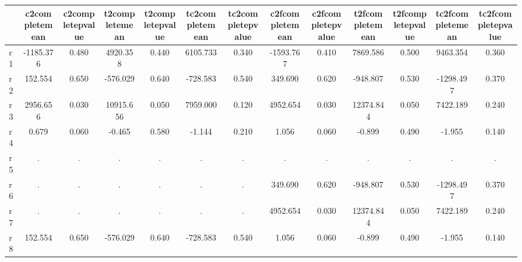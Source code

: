 \begin{table}[htbp]
\begin{tabular}{lcccccccccccc} \hline \hline
 & c2completemean  & c2completepvalue  & t2completemean  & t2completepvalue  & tc2completemean  & tc2completepvalue  & c2fcompletemean  & c2fcompletepvalue  & t2fcompletemean  & t2fcompletepvalue  & tc2fcompletemean  & tc2fcompletepvalue  \\  \hline 
r1 & -1185.376 &     0.480 &  4920.358 &     0.440 &  6105.733 &     0.340 & -1593.767 &     0.410 &  7869.586 &     0.500 &  9463.354 &     0.360 \\  
r2 &   152.554 &     0.650 &  -576.029 &     0.640 &  -728.583 &     0.540 &   349.690 &     0.620 &  -948.807 &     0.530 & -1298.497 &     0.370 \\  
r3 &  2956.656 &     0.030 & 10915.656 &     0.050 &  7959.000 &     0.120 &  4952.654 &     0.030 & 12374.844 &     0.050 &  7422.189 &     0.240 \\  
r4 &     0.679 &     0.060 &    -0.465 &     0.580 &    -1.144 &     0.210 &     1.056 &     0.060 &    -0.899 &     0.490 &    -1.955 &     0.140 \\  
r5 &         . &         . &         . &         . &         . &         . &         . &         . &         . &         . &         . &         . \\  
r6 &         . &         . &         . &         . &         . &         . &   349.690 &     0.620 &  -948.807 &     0.530 & -1298.497 &     0.370 \\  
r7 &         . &         . &         . &         . &         . &         . &  4952.654 &     0.030 & 12374.844 &     0.050 &  7422.189 &     0.240 \\  
r8 &   152.554 &     0.650 &  -576.029 &     0.640 &  -728.583 &     0.540 &     1.056 &     0.060 &    -0.899 &     0.490 &    -1.955 &     0.140 \\  
\hline \hline \end{tabular}
\end{table}
